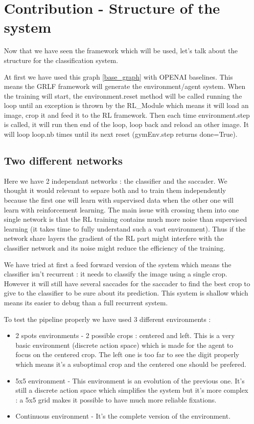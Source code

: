 \documentclass[11pt]{article}
\begin{document}
\section{Contribution - Structure of the system}
Now that we have seen the framework which will be used, let's talk about the structure for the classification system.

At first we have used this graph \ref{base_graph} with OPENAI baselines. This means the GRLF framework will generate the environment/agent system. When the training will start, the environment.reset method will be called running the loop until an exception is thrown by the RL\_Module which means it will load an image, crop it and feed it to the RL framework. Then each time environment.step is called, it will run then end of the loop, loop back and reload an other image. It will loop loop.nb times until its next reset (gymEnv.step returns done=True).
\subsection{Two different networks}
Here we have 2 independant networks : the classifier and the saccader. We thought it would relevant to separe both and to train them independently because the first one will learn with supervised data when the other one will learn with reinforcement learning. The main issue with crossing them into one single network is that the RL training contains much more noise than supervised learning (it takes time to fully understand such a vast environment). Thus if the network share layers the gradient of the RL part might interfere with the classifier network and its noise might reduce the efficiency of the training.

We have tried at first a feed forward version of the system which means the classifier isn't recurrent : it needs to classify the image using a single crop. However it will still have several saccades for the saccader to find the best crop to give to the classifier to be sure about its prediction. This system is shallow which means its easier to debug than a full recurrent system.

To test the pipeline properly we have used 3 different environments : 
\begin{itemize}
\item 2 spots environments - 2 possible crops : centered and left. This is a very basic environment (discrete action space) which is made for the agent to focus on the centered crop. The left one is too far to see the digit properly which means it's a suboptimal crop and the centered one should be prefered.
\item 5x5 environment - This environment is an evolution of the previous one. It's still a discrete action space which simplifies the system but it's more complex : a 5x5 grid makes it possible to have much more reliable fixations.
\item Continuous environment - It's the complete version of the environment.
\end{itemize}
\end{document}
